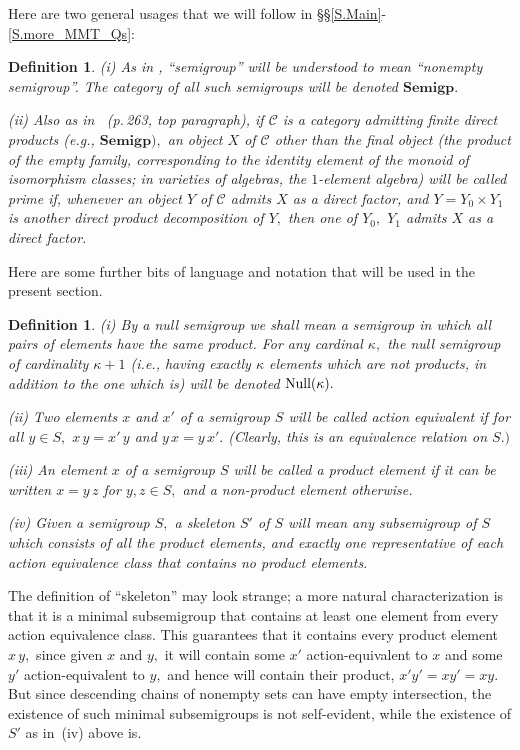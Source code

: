 \documentclass{amsart}
\newtheorem{definition}[theorem]{Definition}
\numberwithin{equation}{section}
\numberwithin{theorem}{section}
\begin{document}
Here are two general usages that we will follow
in \S\S\ref{S.Main}-\ref{S.more_MMT_Qs}:

\begin{definition}\label{D.gen}
{\rm(i)} As in \cite{MMT}, ``semigroup'' will be
understood to mean ``nonempty semigroup''.
The category of all such semigroups will be denoted $\mathbf{Semigp}.$

{\rm(ii)} Also as in~\cite{MMT} {\rm(}p.\,263, top paragraph{\rm)},
if $\mathcal{C}$ is a category admitting finite direct products
{\rm(}e.g., $\mathbf{Semigp}),$
an object $X$ of $\mathcal{C}$ {\em other than} the final object
{\rm(}the product of the empty family, corresponding to the
identity element of the monoid of isomorphism classes; in
varieties of algebras, the $\!1\!$-element algebra{\rm)}
will be called {\em prime} if,
whenever an object $Y$ of $\mathcal{C}$ admits $X$ as a direct factor,
and $Y = Y_0\times Y_1$ is another direct product decomposition of $Y,$
then one of $Y_0,$ $Y_1$ admits $X$ as a direct factor.
\end{definition}

Here are some further bits of language and notation that will
be used in the present section.

\begin{definition}\label{D.null}
{\rm(i)} By a {\em null semigroup} we shall mean a semigroup
in which all pairs of elements have the same product.
For any cardinal $\kappa,$ the null semigroup of cardinality
$\kappa\!+\!1$ \textup{(}i.e., having exactly $\kappa$ elements
which are not products, in addition to the one which is\textup{)}
will be denoted $\textup{Null}(\kappa).$

{\rm(ii)} Two elements $x$ and $x'$ of a semigroup $S$
will be called {\em action equivalent} if for all $y\in S,$
$x\,y=x'\,y$ and $y\,x=y\,x'.$
\textup{(}Clearly, this is an equivalence relation on $S.)$

{\rm(iii)} An element $x$ of a semigroup $S$ will be called
a {\em product element} if it can be written $x=y\,z$ for $y,z\in S,$
and a {\em non-product element} otherwise.

{\rm(iv)} Given a semigroup $S,$ a {\em skeleton} $S'$ of $S$ will
mean any subsemigroup of $S$ which consists of all the product
elements, and exactly one representative of each
action equivalence class that contains no product elements.
\end{definition}

The definition of ``skeleton'' may look strange; a more natural
characterization is that it is a minimal subsemigroup that
contains at least one element from every action equivalence class.
This guarantees that it contains every product element $x\,y,$
since given $x$ and $y,$ it will contain
some $x'$ action-equivalent to $x$ and
some $y'$ action-equivalent to $y,$ and
hence will contain their product, $x'y'=xy'=xy.$
But since descending chains of nonempty sets can have
empty intersection, the existence of such minimal subsemigroups
is not self-evident, while the existence of $S'$ as in~(iv)
above is.
\end{document}
